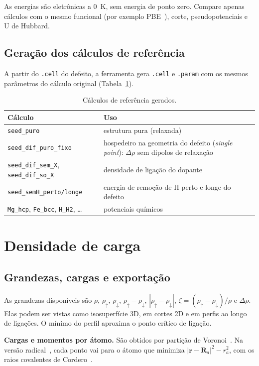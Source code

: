 \documentclass[11pt,a4paper]{article}
\begin{document}
\begin{nota}
As energias são eletrônicas a \SI{0}{K}, sem energia de ponto zero. Compare apenas cálculos com o mesmo funcional (por exemplo PBE~\cite{perdew1996pbe}), corte, pseudopotenciais e U de Hubbard.
\end{nota}

\subsection{Geração dos cálculos de referência}
A partir do \texttt{.cell} do defeito, a ferramenta gera \texttt{.cell} e \texttt{.param} com os mesmos parâmetros do cálculo original (Tabela~\ref{tab:refs}).
\begin{table}[h]\centering\small
\caption{Cálculos de referência gerados.}\label{tab:refs}
\begin{tabularx}{\linewidth}{lX}\toprule
Cálculo & Uso\\\midrule
\texttt{seed\_puro} & estrutura pura (relaxada)\\
\texttt{seed\_dif\_puro\_fixo} & hospedeiro na geometria do defeito (\textit{single point}): $\Delta\rho$ sem dipolos de relaxação\\
\texttt{seed\_dif\_sem\_X}, \texttt{seed\_dif\_so\_X} & densidade de ligação do dopante\\
\texttt{seed\_semH\_perto/longe} & energia de remoção de H perto e longe do defeito\\
\texttt{Mg\_hcp}, \texttt{Fe\_bcc}, \texttt{H\_H2}, \ldots & potenciais químicos\\\bottomrule
\end{tabularx}
\end{table}

\section{Densidade de carga}
\subsection{Grandezas, cargas e exportação}
As grandezas disponíveis são $\rho$, $\rho_\uparrow$, $\rho_\downarrow$, $\rho_\uparrow-\rho_\downarrow$, $|\rho_\uparrow-\rho_\downarrow|$, $\zeta=(\rho_\uparrow-\rho_\downarrow)/\rho$ e $\Delta\rho$. Elas podem ser vistas como isosuperfície 3D, em cortes 2D e em perfis ao longo de ligações. O mínimo do perfil aproxima o ponto crítico de ligação.

\textbf{Cargas e momentos por átomo.} São obtidos por partição de Voronoi~\cite{voronoi1908}. Na versão radical~\cite{gellatly1982}, cada ponto vai para o átomo que minimiza $|\mathbf r-\mathbf R_a|^2-r_a^2$, com os raios covalentes de Cordero~\cite{cordero2008}.
\end{document}
